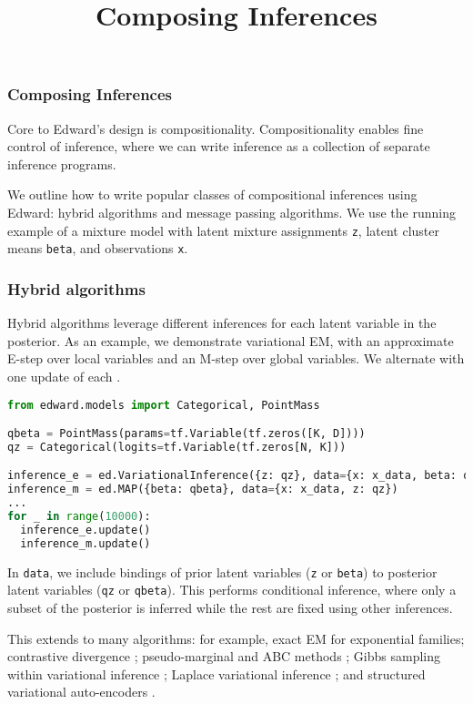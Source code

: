 \title{Composing Inferences}

\subsubsection{Composing Inferences}

Core to Edward's design is compositionality. Compositionality enables
fine control of inference, where we can write inference as a
collection of separate inference programs.

We outline how to write popular classes of compositional inferences
using Edward: hybrid algorithms and message passing algorithms.
We use the running example of a mixture model
with latent mixture assignments \texttt{z}, latent cluster means
\texttt{beta}, and observations \texttt{x}.

\subsubsection{Hybrid algorithms}

Hybrid algorithms leverage different inferences for each latent
variable in the posterior.
As an example, we demonstrate variational EM, with an approximate
E-step over local variables and an M-step over global variables.
We alternate with one update of each \citep{neal1993new}.

\begin{lstlisting}[language=Python]
from edward.models import Categorical, PointMass

qbeta = PointMass(params=tf.Variable(tf.zeros([K, D])))
qz = Categorical(logits=tf.Variable(tf.zeros[N, K]))

inference_e = ed.VariationalInference({z: qz}, data={x: x_data, beta: qbeta})
inference_m = ed.MAP({beta: qbeta}, data={x: x_data, z: qz})
...
for _ in range(10000):
  inference_e.update()
  inference_m.update()
\end{lstlisting}

In \texttt{data}, we include bindings of prior latent variables
(\texttt{z} or \texttt{beta}) to posterior latent variables
(\texttt{qz} or \texttt{qbeta}). This performs conditional inference,
where only a subset of the posterior is inferred while the rest are
fixed using other inferences.

This extends to many algorithms: for example,
exact EM for exponential families;
contrastive divergence \citep{hinton2002training};
pseudo-marginal and ABC methods \citep{andrieu2009pseudo};
Gibbs sampling within variational inference \citep{wang2012truncation};
Laplace variational inference \citep{wang2013variational};
and
structured variational auto-encoders \citep{johnson2016composing}.

